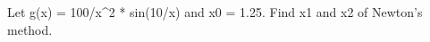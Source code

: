\UseRawInputEncoding

\begin{center}
    Let g(x) = 100/x^2 * sin(10/x) and x0 = 1.25. Find x1 and x2 of Newton’s method.
\end{center}
